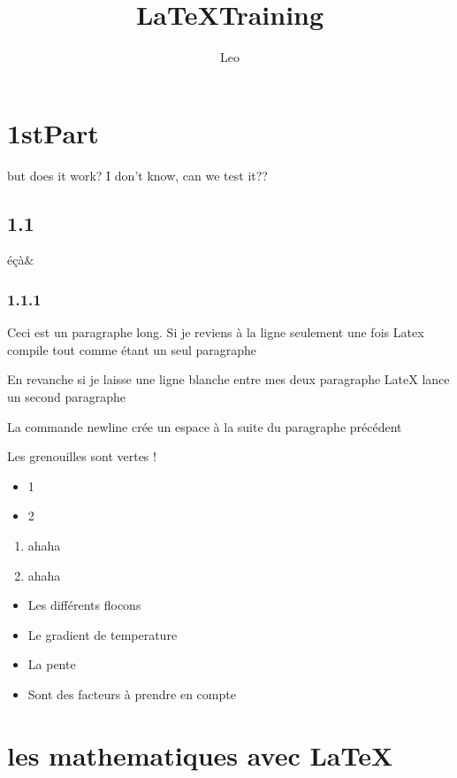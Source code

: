 \documentclass[a4paper, 10pt]{article}
\title{\LaTeX  Training}
\author{Leo}
\begin{document}
\maketitle
\tableofcontents
\newpage
\begin{multicols}{2}

\section{1stPart}
but does it work?
I don't know, can we test it?? 

\subsection{1.1}
éçà\& %
\subsubsection{1.1.1}


Ceci est un paragraphe long. 
Si je reviens à la  ligne seulement une fois Latex compile tout comme étant un seul paragraphe

En revanche si je laisse une ligne blanche entre mes deux paragraphe LateX lance un second paragraphe
\newline

La commande newline crée un espace à la suite du paragraphe précédent

Les grenouilles sont vertes !


\begin{itemize}
\item 1
\newline
\item 2 
\end{itemize}


\begin{enumerate}
\item ahaha
\item ahaha
\end{enumerate}

\begin{itemize}
	\item Les différents flocons
	\item Le gradient de temperature
	\item La pente
	\item Sont des facteurs à prendre en compte
\end{itemize}

\section{les mathematiques avec \LaTeX}


\end{multicols}
\end{document}
